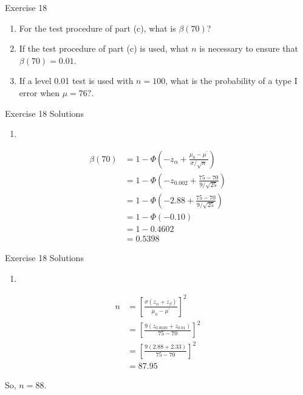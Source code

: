 \documentclass[
  ignorenonframetext,
]{beamer}
\providecommand{\tightlist}{%
  \setlength{\itemsep}{0pt}\setlength{\parskip}{0pt}}\usepackage{longtable,booktabs,array}
\begin{document}
\begin{frame}{Exercise 18}
\protect\hypertarget{exercise-18-1}{}
\begin{enumerate}[<+->]
[a.]
\setcounter{enumi}{3}
\tightlist
\item
  For the test procedure of part (c), what is \(\beta(70)\)?
\item
  If the test procedure of part (c) is used, what \(n\) is necessary to
  ensure that \(\beta(70) = 0.01\).
\item
  If a level 0.01 test is used with \(n=100\), what is the probability
  of a type I error when \(\mu = 76?\).
\end{enumerate}
\end{frame}

\begin{frame}{Exercise 18 Solutions}
\protect\hypertarget{exercise-18-solutions-3}{}
\begin{enumerate}[<+->]
[a.]
\setcounter{enumi}{3}
\tightlist
\item
\end{enumerate}

\[
\begin{aligned}
\beta(70) &= 1 - \Phi\left(-z_{\alpha} + \frac{\mu_{0} - \mu^{\prime}}{\sigma/\sqrt{n}}\right) \\
&= 1 - \Phi\left(-z_{0.002} + \frac{75 - 70}{9/\sqrt{25}}\right) \\
&= 1 - \Phi\left(-2.88 + \frac{75 - 70}{9/\sqrt{25}}\right)\\
&= 1 - \Phi(-0.10) \\
&= 1 - 0.4602 \\
&= 0.5398
\end{aligned}
\]
\end{frame}

\begin{frame}{Exercise 18 Solutions}
\protect\hypertarget{exercise-18-solutions-4}{}
\begin{enumerate}[<+->]
[a.]
\setcounter{enumi}{4}
\tightlist
\item
\end{enumerate}

\[
\begin{aligned}
n &= \left[\frac{\sigma(z_{\alpha} + z_{\beta})}{\mu_{0}-\mu^{\prime}}  \right]^{2} \\
&= \left[\frac{9(z_{0.0020} + z_{0.01})}{75-70}\right]^{2}\\
&= \left[\frac{9(2.88 + 2.33)}{75-70}\right]^{2} \\
&= 87.95
\end{aligned}
\]

So, \(n = 88\).
\end{frame}
\end{document}
